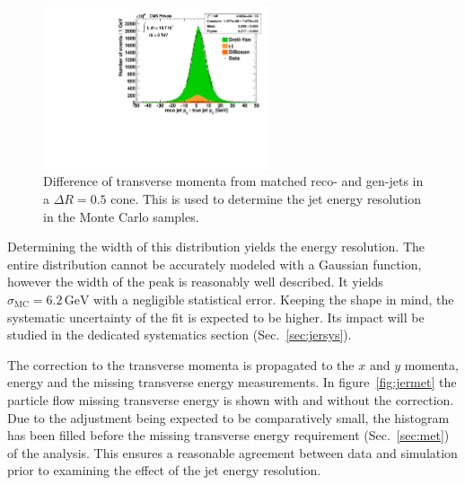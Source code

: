 \begin{figure}[htb!]
  \centering
  \includegraphics[width=0.6\textwidth]{plots/jer_deltapt.pdf}
  \caption{Difference of transverse momenta from matched reco- and gen-jets in a $\Delta R = 0.5$ cone. This is used to determine the jet energy resolution in the Monte Carlo samples.}
  \label{fig:jerdeltapt}
\end{figure}

\noindent Determining the width of this distribution yields the energy resolution. The entire distribution cannot be accurately modeled with a Gaussian function, however the width of the peak is reasonably well described. It yields $\sigma_{\text{MC}} = 6.2\,\text{GeV}$ with a negligible statistical error. Keeping the shape in mind, the systematic uncertainty of the fit is expected to be higher. Its impact will be studied in the dedicated systematics section (Sec.~\ref{sec:jersys}).

The correction to the transverse momenta is propagated to the $x$ and $y$ momenta, energy and the missing transverse energy measurements. In figure~\ref{fig:jermet} the particle flow missing transverse energy is shown with and without the correction. Due to the adjustment being expected to be comparatively small, the histogram has been filled before the missing transverse energy requirement (Sec.~\ref{sec:met}) of the analysis. This ensures a reasonable agreement between data and simulation prior to examining the effect of the jet energy resolution.

